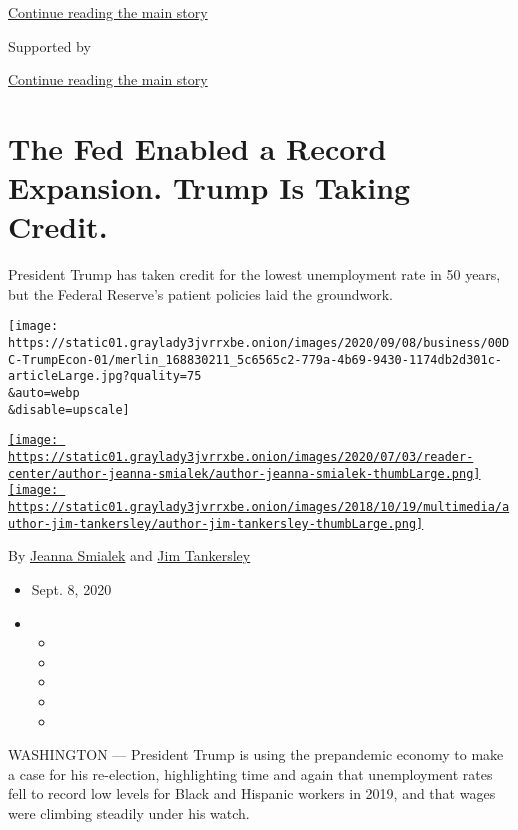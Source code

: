 \protect\hyperlink{after-top}{Continue reading the main story}

Supported by

\protect\hyperlink{after-sponsor}{Continue reading the main story}

\hypertarget{the-fed-enabled-a-record-expansion-trump-is-taking-credit}{%
\section{The Fed Enabled a Record Expansion. Trump Is Taking
Credit.}\label{the-fed-enabled-a-record-expansion-trump-is-taking-credit}}

President Trump has taken credit for the lowest unemployment rate in 50
years, but the Federal Reserve's patient policies laid the groundwork.

\texttt{[image: https://static01.graylady3jvrrxbe.onion/images/2020/09/08/business/00DC-TrumpEcon-01/merlin\_168830211\_5c6565c2-779a-4b69-9430-1174db2d301c-articleLarge.jpg?quality=75\\\&auto=webp\\\&disable=upscale]}

\href{https://www.nytimes3xbfgragh.onion/by/jeanna-smialek}{\texttt{[image: https://static01.graylady3jvrrxbe.onion/images/2020/07/03/reader-center/author-jeanna-smialek/author-jeanna-smialek-thumbLarge.png]}}\href{https://www.nytimes3xbfgragh.onion/by/jim-tankersley}{\texttt{[image: https://static01.graylady3jvrrxbe.onion/images/2018/10/19/multimedia/author-jim-tankersley/author-jim-tankersley-thumbLarge.png]}}

By \href{https://www.nytimes3xbfgragh.onion/by/jeanna-smialek}{Jeanna
Smialek} and
\href{https://www.nytimes3xbfgragh.onion/by/jim-tankersley}{Jim
Tankersley}

\begin{itemize}
\item
  Sept. 8, 2020
\item
  \begin{itemize}
  \item
  \item
  \item
  \item
  \item
  \end{itemize}
\end{itemize}

WASHINGTON --- President Trump is using the prepandemic economy to make
a case for his re-election, highlighting time and again that
unemployment rates fell to record low levels for Black and Hispanic
workers in 2019, and that wages were climbing steadily under his watch.

